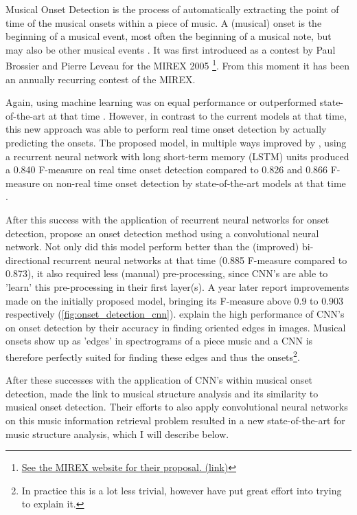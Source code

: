 Musical Onset Detection is the process of automatically extracting the point of time of the musical onsets within a piece of music. A (musical) onset is the beginning of a musical event, most often the beginning of a musical note, but may also be other musical events \cite{Bello2005tutorial,Zhou2011music}. It was first introduced as a contest by Paul Brossier and Pierre Leveau for the MIREX 2005 \footnote{\href{https://www.music-ir.org/mirex/wiki/2005:Audio_Onset_Detect}{See the MIREX website for their proposal. (link)}}. From this moment it has been an annually recurring contest of the MIREX.

Again, using machine learning was on equal performance or outperformed state-of-the-art at that time \cite{Eyben2010universal}. However, in contrast to the current models at that time, this new approach was able to perform real time onset detection by actually predicting the onsets. The proposed model, in multiple ways improved by \citeauthor{Bock2012online}, using a recurrent neural network with long short-term memory (LSTM) units produced a 0.840 F-measure on real time onset detection compared to 0.826 and 0.866 F-measure on non-real time onset detection by state-of-the-art models at that time \cite{Bock2012online}.

After this success with the application of recurrent neural networks for onset detection, \textcite{Schluter2013musical} propose an onset detection method using a convolutional neural network. Not only did this model perform better than the (improved) bi-directional recurrent neural networks at that time (0.885 F-measure compared to 0.873), it also required less (manual) pre-processing, since CNN's are able to 'learn' this pre-processing in their first layer(s). A year later \textcite{Schluter2014improved} report improvements made on the initially proposed model, bringing its F-measure above 0.9 to 0.903 respectively (\autoref{fig:onset_detection_cnn}). \citeauthor{Schluter2014improved} explain the high performance of CNN's on onset detection by their accuracy in finding oriented edges in images. Musical onsets show up as 'edges' in spectrograms of a piece music and a CNN is therefore perfectly suited for finding these edges and thus the onsets\footnote{In practice this is a lot less trivial, however \textcite{Schluter2014improved} have put great effort into trying to explain it.}.

After these successes with the application of CNN's within musical onset detection, \citeauthor{Ullrich2014boundary} made the link to musical structure analysis and its similarity to musical onset detection. Their efforts to also apply convolutional neural networks on this music information retrieval problem resulted in a new state-of-the-art for music structure analysis, which I will describe below.


